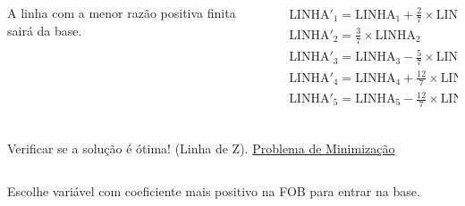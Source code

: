 \documentclass{beamer}
\begin{document}
\begin{frame}
{\begin{columns}
\begin{column}{5cm}
			\end{column}
		\end{columns}
	}	
	{
		\begin{columns}
			\begin{column}{5cm}
				\begin{mdframed}[backgroundcolor=orange!80]
					A linha com a menor razão positiva finita sairá da base.
				\end{mdframed}
			\end{column}
			\begin{column}{5cm}
				$
					\begin{matrix}
						\scriptstyle \text{LINHA}'_1 = \text{LINHA}_1 + \frac{2}{7} \times \text{LINHA}_2\\
						\scriptstyle \text{LINHA}'_2 = \frac{3}{7} \times \text{LINHA}_2 \\
						\scriptstyle \text{LINHA}'_3 = \text{LINHA}_3 - \frac{5}{7} \times \text{LINHA}_2 \\
						\scriptstyle \text{LINHA}'_4 = \text{LINHA}_4 + \frac{12}{7} \times \text{LINHA}_2 \\
						\scriptstyle \text{LINHA}'_5 = \text{LINHA}_5 - \frac{12}{7} \times \text{LINHA}_2 \\
					\end{matrix}
				$
			\end{column}
		\end{columns}
	}	
	\only<9>
	{
		\begin{columns}
			\begin{column}{5cm}
				\begin{mdframed}[backgroundcolor=olive!80]
					Verificar se a solução é ótima! (Linha de Z). \underline{Problema de Minimização}
				\end{mdframed}
			\end{column}
			\begin{column}{5cm}

			\end{column}
		\end{columns}
	}	
	\only<10>
	{
		\begin{columns}
			\begin{column}{5cm}
				\begin{mdframed}[backgroundcolor=orange!80]
					Escolhe variável com coeficiente mais positivo na FOB para entrar na base.
				\end{mdframed}
			\end{column}
			\begin{column}{5cm}


\end{column}
\end{columns}}
\end{frame}
\end{document}
